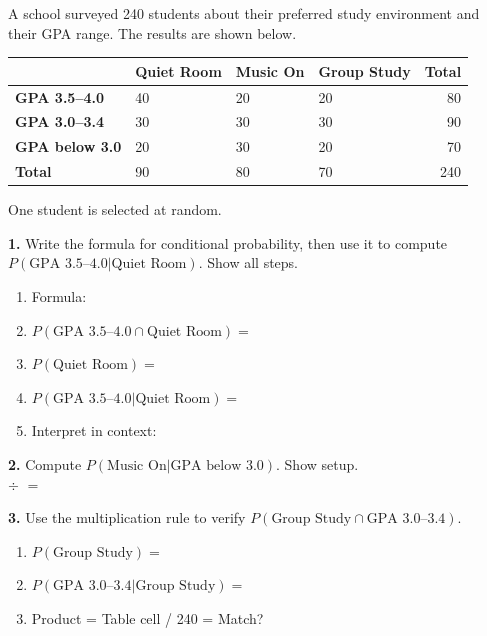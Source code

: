 \documentclass[10pt]{article}
\begin{document}
\namedateperiod

\vspace{0.1in}

\begin{practicebox}
\small
A school surveyed 240 students about their preferred study environment and their
GPA range. The results are shown below.

\vspace{6pt}
\renewcommand{\arraystretch}{1.4}
\begin{tabularx}{\linewidth}{@{} l X X X r @{}}
 & \textbf{Quiet Room} & \textbf{Music On} & \textbf{Group Study} & \textbf{Total} \\
\hline
\textbf{GPA 3.5--4.0} & 40 & 20 & 20 & 80 \\
\textbf{GPA 3.0--3.4} & 30 & 30 & 30 & 90 \\
\textbf{GPA below 3.0} & 20 & 30 & 20 & 70 \\
\hline
\textbf{Total}         & 90 & 80 & 70 & 240 \\
\end{tabularx}

\vspace{8pt}
One student is selected at random.

\vspace{8pt}
\textbf{1.} Write the formula for conditional probability, then use it to compute
$P(\text{GPA 3.5--4.0} | \text{Quiet Room})$. Show all steps.
\begin{enumerate}[label=(\alph*), leftmargin=2em, itemsep=6pt]
  \item Formula: \blank{9cm}
  \item $P(\text{GPA 3.5--4.0} \cap \text{Quiet Room}) = $ \blank{4cm}
  \item $P(\text{Quiet Room}) = $ \blank{4cm}
  \item $P(\text{GPA 3.5--4.0} | \text{Quiet Room}) = $ \blank{5cm}
  \item Interpret in context: \writeline\writeline
\end{enumerate}

\vspace{8pt}
\textbf{2.} Compute $P(\text{Music On} | \text{GPA below 3.0})$. Show setup.\\
\blank{4cm} $\div$ \blank{4cm} $=$ \blank{3cm}

\vspace{8pt}
\textbf{3.} Use the multiplication rule to verify $P(\text{Group Study} \cap \text{GPA 3.0--3.4})$.
\begin{enumerate}[label=(\alph*), leftmargin=2em, itemsep=6pt]
  \item $P(\text{Group Study}) = $ \blank{4cm}
  \item $P(\text{GPA 3.0--3.4} | \text{Group Study}) = $ \blank{4cm}
  \item Product = \blank{5cm} \quad Table cell / 240 = \blank{5cm} \quad Match? \blank{2cm}
\end{enumerate}


\end{practicebox}
\end{document}
